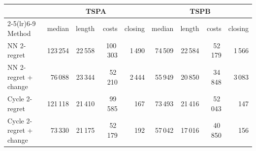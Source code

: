 \begin{tabular}{lrrrrrrrr}
\toprule
 & \multicolumn{4}{c}{TSPA} & \multicolumn{4}{c}{TSPB} \\
\cmidrule(lr){2-5}\cmidrule(lr){6-9}
Method & median & length & costs & closing & median & length & costs & closing \\
\midrule
NN 2-regret & 123\,254 & 22\,558 & 100\,303 & 1\,490 & 74\,509 & 22\,584 & 52\,179 & 1\,566 \\
NN 2-regret + change & 76\,088 & 23\,344 & 52\,210 & 2\,444 & 55\,949 & 20\,850 & 34\,848 & 3\,083 \\
Cycle 2-regret & 121\,118 & 21\,410 & 99\,585 & 167 & 73\,493 & 21\,416 & 52\,043 & 147 \\
Cycle 2-regret + change & 73\,330 & 21\,175 & 52\,179 & 192 & 57\,042 & 17\,016 & 40\,850 & 156 \\
\bottomrule
\end{tabular}
